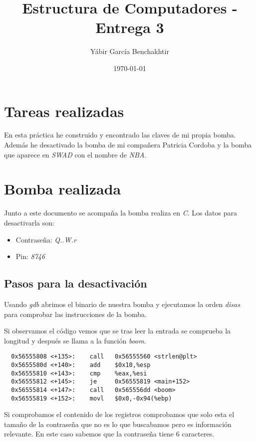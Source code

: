 \documentclass{article}
\begin{document}
\title{Estructura de Computadores - Entrega 3}
\author{Yábir García Benchakhtir}
\date{\today}
\maketitle

\section{Tareas realizadas}

En esta práctica he construido y encontrado las claves de mi propia
bomba. Además he desactivado la bomba de mi compañera Patricia Cordoba
y la bomba que aparece en \textit{SWAD} con el nombre de \textit{NBA}.

\section{Bomba realizada}

Junto a este documento se acompaña la bomba realiza en \textit{C}. Los
datos para desactivarla son:

\begin{itemize}
  \item Contraseña: \textit{Q..W.r}
  \item Pin: \textit{8746}
\end{itemize}

\subsection{Pasos para la desactivación}

Usando \textit{gdb} abrimos el binario de nuestra bomba y ejecutamos
la orden \textit{disas} para comprobar las instrucciones de la bomba.

Si observamos el código vemos que se tras leer la entrada se comprueba
la longitud y después se llama a la función \textit{boom}.

\begin{lstlisting}
  0x56555808 <+135>:	call   0x56555560 <strlen@plt>
  0x5655580d <+140>:	add    $0x10,%esp
  0x56555810 <+143>:	cmp    %eax,%esi
  0x56555812 <+145>:	je     0x56555819 <main+152>
  0x56555814 <+147>:	call   0x565556dd <boom>
  0x56555819 <+152>:	movl   $0x0,-0x94(%ebp)

\end{lstlisting}

Si comprobamos el contenido de los registros comprobamos que solo esta
el tamaño de la contraseña que no es lo que buscabamos pero es
información relevante. En este caso sabemos que la contraseña tiene 6
caracteres.
\end{document}
